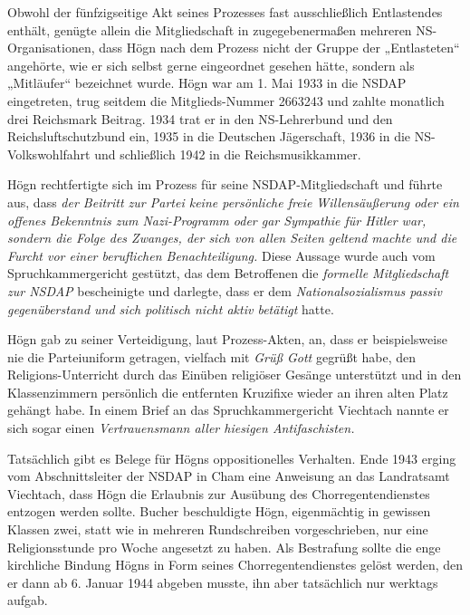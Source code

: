 \documentclass{book}
\begin{document}
Obwohl der fünfzigseitige Akt seines Prozesses fast ausschließlich
Entla\-stendes enthält, genügte allein die Mitgliedschaft in
zugegebenermaßen mehre\-ren NS-Organisationen, dass Högn nach dem
Prozess nicht der Gruppe der „Entlasteten“ angehörte, wie er sich
selbst gerne eingeordnet gesehen hätte, sondern als „Mitläufer“
bezeichnet wurde. Högn war am 1. Mai 1933 in die NSDAP eingetreten,
trug seitdem die Mitglieds-Nummer 2663243 und zahlte monatlich drei
Reichsmark Beitrag. 1934 trat er in den NS-Lehrerbund und den
Reichsluftschutzbund ein, 1935 in die Deutschen Jägerschaft, 1936 in
die NS-Volkswohlfahrt und schließlich 1942 in die Reichsmusikkammer.


Högn rechtfertigte sich im Prozess für seine NSDAP-Mitgliedschaft und
führte aus, dass \textit{der Beitritt zur Partei keine persönliche
freie Willensäußerung oder ein offenes Bekenntnis zum Nazi-Programm
oder gar Sympathie für Hitler war, sondern die Folge des Zwanges, der
sich von allen Seiten geltend machte und die Furcht vor einer
berufli\-chen Benachteiligung.} Diese Aussage wurde auch vom
Spruchkammergericht ge\-stützt, das dem Betroffenen die
\textit{formelle Mitgliedschaft zur NSDAP} bescheinigte und darlegte,
dass er dem \textit{Nationalsozialismus passiv gegenüberstand und sich
politisch nicht aktiv betätigt} hatte.

Högn gab zu seiner Verteidigung, laut Prozess-Akten, an, dass er
bei\-spielsweise nie die Parteiuniform getragen, vielfach mit
\textit{Grüß Gott} gegrüßt habe, den Religions-Unterricht durch das
Einüben religiöser Gesänge unter\-stützt und in den Klassenzimmern
persönlich die entfernten Kruzifixe wieder an ihren alten Platz gehängt
habe. In einem Brief an das Spruchkammergericht Viechtach nannte er
sich sogar einen \textit{Vertrauensmann aller hiesigen Antifaschisten.}

Tatsächlich gibt es Belege für Högns oppositionelles Verhalten. Ende
1943 erging vom Abschnittsleiter der NSDAP in Cham eine Anweisung an
das Landratsamt Viechtach, dass Högn die Erlaubnis zur Ausübung des
Chorre\-gentendienstes entzogen werden sollte. Bucher beschuldigte
Högn, eigen\-mächtig in gewissen Klassen zwei, statt wie in mehreren
Rundschreiben vor\-geschrieben, nur eine Religionsstunde pro Woche
angesetzt zu haben. Als Be\-strafung sollte die enge kirchliche Bindung
Högns in Form seines Chorregen\-tendienstes gelöst werden, den er dann
ab 6. Januar 1944 abgeben musste, ihn aber tatsächlich nur werktags
aufgab.
\end{document}
